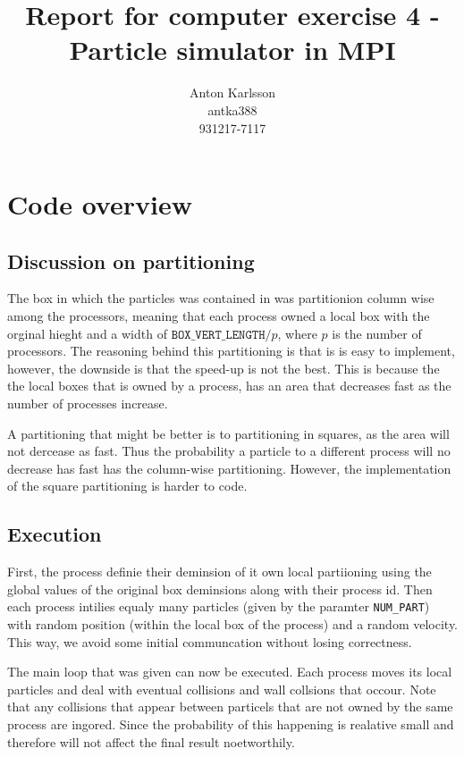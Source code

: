 \documentclass[two column]{article}
\title{Report for computer exercise 4 - Particle simulator in MPI}
\author{Anton Karlsson\\antka388\\931217-7117}
\date{}
\begin{document}
\maketitle

\section{Code overview}
\label{sec:code-overview}

\subsection{Discussion on partitioning}
\label{sec:disc-part}



The box in which the particles was contained in was partitionion column
wise among the processors, meaning that each process owned a local box
with the orginal hieght and a width of $\texttt{BOX\_VERT\_LENGTH}/p$,
where $p$ is the number of processors. The reasoning behind this
partitioning is that is is easy to implement, however, the downside is
that the speed-up  is not the best. This is because the the local boxes
that is owned by a process, has an area that decreases fast as the
number of processes increase. 

A partitioning that might be better is to partitioning in squares, 
as the area will not dercease as fast. Thus
the probability a particle to a different process will no
decrease has fast has the column-wise partitioning. However, the
implementation of the square partitioning is harder to code.

\subsection{Execution}
\label{sec:execution}

First, the process definie their deminsion of it own local partiioning
using the global values of the original box deminsions along with their
process id. Then each process intilies equaly many particles (given by
the paramter \texttt{NUM\_PART}) with random position (within the local
box of the process) and a random velocity. This way, we avoid some
initial communcation without losing correctness.

The main loop that was given can now be executed. Each process moves
its local particles and deal with eventual collisions and wall
collsions that occour. Note that any collisions that appear between
particels that are not owned by the same process are ingored. Since the
probability of  this happening is realative small and therefore will
not affect the final result noetworthily. 
\end{document}
